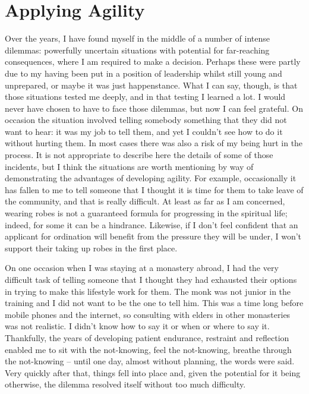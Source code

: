 \section{Applying Agility}

\enlargethispage{\baselineskip}

Over the years, I have found myself in the middle of a number of intense
dilemmas: powerfully uncertain situations with potential for
far-reaching consequences, where I am required to make a decision.
Perhaps these were partly due to my having been put in a position of
leadership whilst still young and unprepared, or maybe it was just
happenstance. What I can say, though, is that those situations tested me
deeply, and in that testing I learned a lot. I would never have chosen
to have to face those dilemmas, but now I can feel grateful. On occasion
the situation involved telling somebody something that they did not want
to hear: it was my job to tell them, and yet I couldn't see how to do it
without hurting them. In most cases there was also a risk of my being
hurt in the process. It is not appropriate to describe here the details
of some of those incidents, but I think the situations are worth
mentioning by way of demonstrating the advantages of developing agility.
For example, occasionally it has fallen to me to tell someone that I
thought it is time for them to take leave of the community, and that is
really difficult. At least as far as I am concerned, wearing robes is
not a guaranteed formula for progressing in the spiritual life; indeed,
for some it can be a hindrance. Likewise, if I don't feel confident that
an applicant for ordination will benefit from the pressure they will be
under, I won't support their taking up robes in the first place.

On one occasion when I was staying at a monastery abroad, I had the very
difficult task of telling someone that I thought they had exhausted
their options in trying to make this lifestyle work for them. The monk
was not junior in the training and I did not want to be the one to tell
him. This was a time long before mobile phones and the internet, so
consulting with elders in other monasteries was not realistic. I didn't
know how to say it or when or where to say it. Thankfully, the years of
developing patient endurance, restraint and reflection enabled me to sit
with the not-knowing, feel the not-knowing, breathe through the
not-knowing -- until one day, almost without planning, the words were
said. Very quickly after that, things fell into place and, given the
potential for it being otherwise, the dilemma resolved itself without
too much difficulty.

